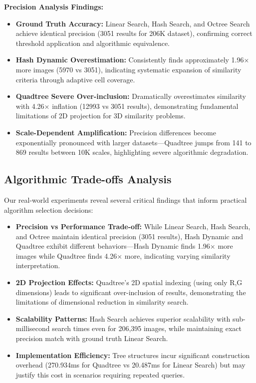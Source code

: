 \documentclass{sbc2023}
\begin{document}
\textbf{Precision Analysis Findings:}

\begin{itemize}
    \item \textbf{Ground Truth Accuracy:} Linear Search, Hash Search, and Octree Search achieve identical precision (3051 results for 206K dataset), confirming correct threshold application and algorithmic equivalence.
    \item \textbf{Hash Dynamic Overestimation:} Consistently finds approximately 1.96× more images (5970 vs 3051), indicating systematic expansion of similarity criteria through adaptive cell coverage.
    \item \textbf{Quadtree Severe Over-inclusion:} Dramatically overestimates similarity with 4.26× inflation (12993 vs 3051 results), demonstrating fundamental limitations of 2D projection for 3D similarity problems.
    \item \textbf{Scale-Dependent Amplification:} Precision differences become exponentially pronounced with larger datasets—Quadtree jumps from 141 to 869 results between 10K scales, highlighting severe algorithmic degradation.
\end{itemize}

\subsection{Algorithmic Trade-offs Analysis}

Our real-world experiments reveal several critical findings that inform practical algorithm selection decisions:

\begin{itemize}
    \item \textbf{Precision vs Performance Trade-off:} While Linear Search, Hash Search, and Octree maintain identical precision (3051 results), Hash Dynamic and Quadtree exhibit different behaviors—Hash Dynamic finds 1.96× more images while Quadtree finds 4.26× more, indicating varying similarity interpretation.
    \item \textbf{2D Projection Effects:} Quadtree's 2D spatial indexing (using only R,G dimensions) leads to significant over-inclusion of results, demonstrating the limitations of dimensional reduction in similarity search.
    \item \textbf{Scalability Patterns:} Hash Search achieves superior scalability with sub-millisecond search times even for 206,395 images, while maintaining exact precision match with ground truth Linear Search.
    \item \textbf{Implementation Efficiency:} Tree structures incur significant construction overhead (270.934ms for Quadtree vs 20.487ms for Linear Search) but may justify this cost in scenarios requiring repeated queries.
\end{itemize}
\end{document}

